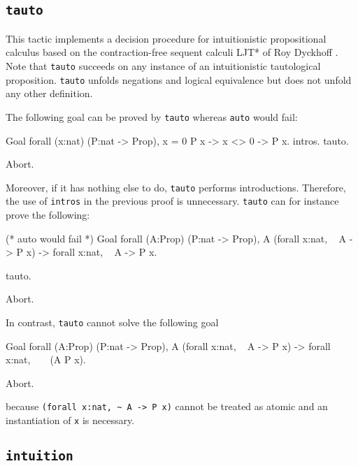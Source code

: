 \begin{coq_example*}
\subsection{\tt tauto}
\label{tauto}

This tactic implements a decision procedure for intuitionistic propositional
calculus based on the contraction-free sequent calculi LJT* of Roy Dyckhoff
\cite{Dyc92}. Note that {\tt tauto} succeeds on any instance of an
intuitionistic tautological proposition. {\tt tauto} unfolds negations
and logical equivalence but does not unfold any other definition.

The following goal can be proved by {\tt tauto} whereas {\tt auto}
would fail:

\begin{coq_example}
Goal forall (x:nat) (P:nat -> Prop), x = 0 \/ P x -> x <> 0 -> P x.
  intros.
  tauto.
\end{coq_example}
\begin{coq_eval}
Abort.
\end{coq_eval}

Moreover, if it has nothing else to do, {\tt tauto} performs
introductions. Therefore, the use of {\tt intros} in the previous
proof is unnecessary. {\tt tauto} can for instance prove the
following:
\begin{coq_example}
(* auto would fail *)
Goal forall (A:Prop) (P:nat -> Prop),
    A \/ (forall x:nat, ~ A -> P x) -> forall x:nat, ~ A -> P x.

  tauto.
\end{coq_example}
\begin{coq_eval}
Abort.
\end{coq_eval}

\Rem In contrast, {\tt tauto} cannot solve the following goal

\begin{coq_example*}
Goal forall (A:Prop) (P:nat -> Prop),
    A \/ (forall x:nat, ~ A -> P x) -> forall x:nat, ~ ~ (A \/ P x).
\end{coq_example*}
\begin{coq_eval}
Abort.
\end{coq_eval}

because \verb=(forall x:nat, ~ A -> P x)= cannot be treated as atomic and an
instantiation of \verb=x= is necessary.

\subsection{\tt intuition \tac}
\label{intuition}


\end{coq_example*}
